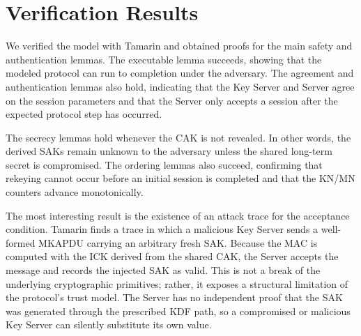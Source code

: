 \section{Verification Results}
\label{sec:results}

We verified the model with Tamarin and obtained proofs for the main safety and authentication lemmas. The executable lemma succeeds, showing that the modeled protocol can run to completion under the adversary. The agreement and authentication lemmas also hold, indicating that the Key Server and Server agree on the session parameters and that the Server only accepts a session after the expected protocol step has occurred.

The secrecy lemmas hold whenever the CAK is not revealed. In other words, the derived SAKs remain unknown to the adversary unless the shared long-term secret is compromised. The ordering lemmas also succeed, confirming that rekeying cannot occur before an initial session is completed and that the KN/MN counters advance monotonically.

The most interesting result is the existence of an attack trace for the acceptance condition. Tamarin finds a trace in which a malicious Key Server sends a well-formed MKAPDU carrying an arbitrary fresh SAK. Because the MAC is computed with the ICK derived from the shared CAK, the Server accepts the message and records the injected SAK as valid. This is not a break of the underlying cryptographic primitives; rather, it exposes a structural limitation of the protocol's trust model. The Server has no independent proof that the SAK was generated through the prescribed KDF path, so a compromised or malicious Key Server can silently substitute its own value.

